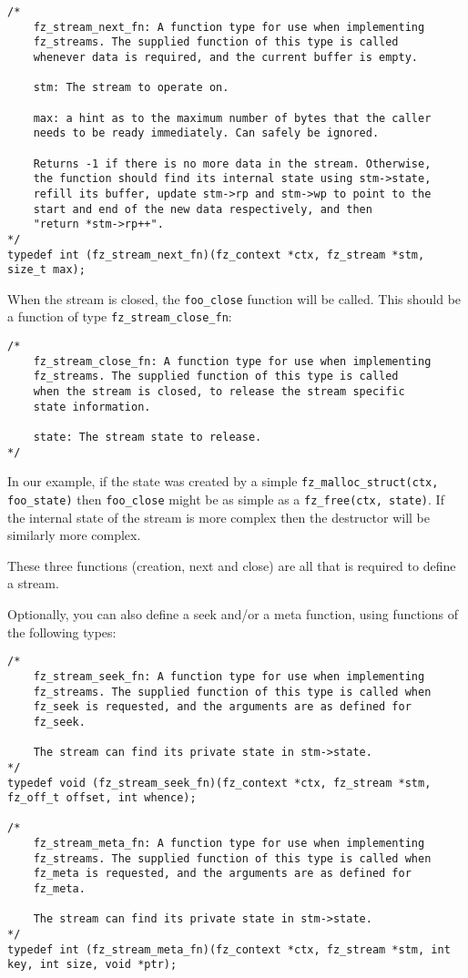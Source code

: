 \documentclass[oneside]{book}
\begin{document}
\begin{lstlisting}
/*
	fz_stream_next_fn: A function type for use when implementing
	fz_streams. The supplied function of this type is called
	whenever data is required, and the current buffer is empty.

	stm: The stream to operate on.

	max: a hint as to the maximum number of bytes that the caller
	needs to be ready immediately. Can safely be ignored.

	Returns -1 if there is no more data in the stream. Otherwise, 
	the function should find its internal state using stm->state,
	refill its buffer, update stm->rp and stm->wp to point to the
	start and end of the new data respectively, and then
	"return *stm->rp++".
*/
typedef int (fz_stream_next_fn)(fz_context *ctx, fz_stream *stm, size_t max);
\end{lstlisting}

When the stream is closed, the \texttt{foo\_close} function will be called. This should be a function of type \texttt{fz\_stream\_close\_fn}:

\begin{lstlisting}
/*
	fz_stream_close_fn: A function type for use when implementing
	fz_streams. The supplied function of this type is called
	when the stream is closed, to release the stream specific
	state information.

	state: The stream state to release.
*/
\end{lstlisting}

In our example, if the state was created by a simple \texttt{fz\_malloc\_struct(ctx, foo\_state)} then \texttt{foo\_close} might be as simple as a \texttt{fz\_free(ctx, state)}. If the internal state of the stream is more complex then the destructor will be similarly more complex.

These three functions (creation, next and close) are all that is required to define a stream.

Optionally, you can also define a seek and/or a meta function, using functions of the following types:

\begin{lstlisting}
/*
	fz_stream_seek_fn: A function type for use when implementing
	fz_streams. The supplied function of this type is called when
	fz_seek is requested, and the arguments are as defined for
	fz_seek.

	The stream can find its private state in stm->state.
*/
typedef void (fz_stream_seek_fn)(fz_context *ctx, fz_stream *stm, fz_off_t offset, int whence);

/*
	fz_stream_meta_fn: A function type for use when implementing
	fz_streams. The supplied function of this type is called when
	fz_meta is requested, and the arguments are as defined for
	fz_meta.

	The stream can find its private state in stm->state.
*/
typedef int (fz_stream_meta_fn)(fz_context *ctx, fz_stream *stm, int key, int size, void *ptr);
\end{lstlisting}
\end{document}
